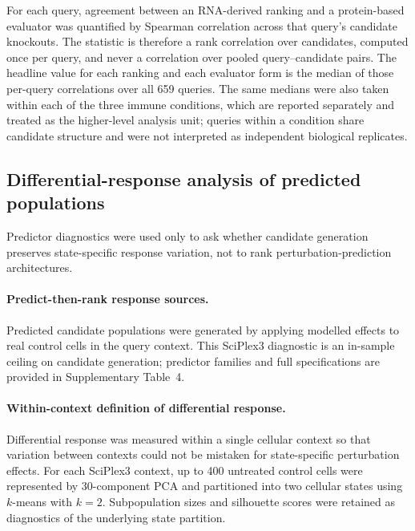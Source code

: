 \documentclass[11pt,letterpaper]{article}
\begin{document}
For each query, agreement between an RNA-derived ranking and a protein-based evaluator was
quantified by Spearman correlation across that query's candidate knockouts. The statistic is
therefore a rank correlation over candidates, computed once per query, and never a correlation over
pooled query--candidate pairs. The headline value for each ranking and each evaluator form is the
median of those per-query correlations over all 659 queries. The same medians were also taken
within each of the three immune conditions, which are reported separately and treated as the
higher-level analysis unit; queries within a condition share candidate structure and were not
interpreted as independent biological replicates.


\iffalse
\subsection*{Differential-response analysis of predicted populations}

Predictor diagnostics were used only to ask whether candidate generation preserves
state-specific response variation, not to rank perturbation-prediction architectures.

\paragraph{Predict-then-rank response sources.}
Predicted candidate populations were generated by applying modelled effects to real control cells
in the query context. This SciPlex3 diagnostic is an in-sample ceiling on candidate generation;
predictor families and full specifications are provided in Supplementary Table~4.

\paragraph{Within-context definition of differential response.}
Differential response was measured within a single cellular context so that variation between
contexts could not be mistaken for state-specific perturbation effects. For each SciPlex3 context,
up to 400 untreated control cells were represented by 30-component PCA and partitioned into two
cellular states using $k$-means with $k=2$. Subpopulation sizes and silhouette scores were retained
as diagnostics of the underlying state partition.
\end{document}
